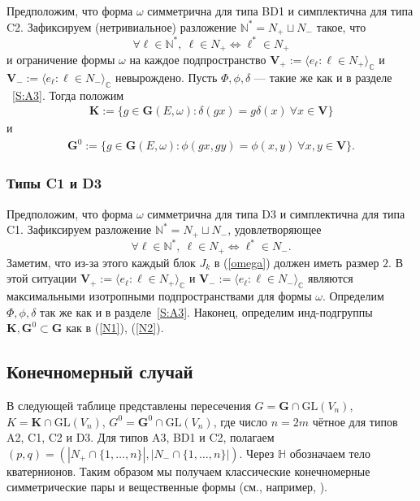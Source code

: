 \documentclass{amsart}
\theoremstyle{definition}
\newcommand{\NN}{\mathbb{N}^*}
\begin{document}
Предположим, что форма $\omega$ симметрична для типа BD1 и симплектична для типа C2.
Зафиксируем (нетривиальное) разложение $\NN=N_+\sqcup N_-$ такое, что
\[\forall \ell\in\NN,\ \ell\in N_+\Leftrightarrow \ell^*\in N_+\]
и ограничение формы $\omega$ на каждое подпространство $\mathbf{V}_+:=\langle e_\ell:\ell\in N_+\rangle_\mathbb{C}$ и
$\mathbf{V}_-:=\langle e_\ell:\ell\in N_-\rangle_\mathbb{C}$ невырождено.
Пусть  $\Phi,\phi,\delta$ --- такие же как и в разделе ~\ref{S:A3}.  Тогда  положим
\begin{eqnarray}
\label{N1}
 \mathbf{K}:=\{g\in \mathbf{G}(E,\omega):\delta(gx)=g\delta(x)\ \forall
x\in\mathbf{V}\}
\end{eqnarray}
и
\begin{eqnarray}
\label{N2}
 \mathbf{G}^0:=\{g\in \mathbf{G}(E,\omega):\phi(gx,gy)=\phi(x,y)\ \forall
 x,y\in\mathbf{V}\}.
\end{eqnarray}


\subsubsection{Типы C1 и D3}
\label{S:C1D3}
Предположим, что форма $\omega$ симметрична для типа D3 и симплектична для типа C1.
Зафиксируем разложение $\NN=N_+\sqcup N_-$, удовлетворяющее
\[
\forall \ell\in\NN,\ \ell\in N_+\Leftrightarrow \ell^*\in N_-.
\]
Заметим, что из-за этого каждый блок  $J_k$ в (\ref{omega}) должен иметь размер $2$.
В этой ситуации $\mathbf{V}_+:=\langle e_\ell:\ell\in N_+\rangle_\mathbb{C}$ и $\mathbf{V}_-:=\langle e_\ell:\ell\in N_-\rangle_\mathbb{C}$
являются максимальными изотропными подпространствами для формы $\omega$.
Определим $\Phi,\phi,\delta$ так же как и в разделе~\ref{S:A3}. Наконец,  определим инд-подгруппы $\mathbf{K},\mathbf{G}^0\subset\mathbf{G}$  как  в (\ref{N1}), (\ref{N2}).


\subsection*{Конечномерный случай}
В следующей таблице представлены пересечения $G=\textbf{G}\cap\mathrm{GL}\left(V_n\right)$, $K=\textbf{K}\cap\mathrm{GL}\left(V_n\right)$, $G^0=\textbf{G}^0\cap\mathrm{GL}\left(V_n\right)$, где число $n=2m$ чётное для типов A2, C1, C2 и D3.
Для типов A3, BD1 и C2, полагаем $(p,q)=(|N_+\cap\{1,\ldots,n\}|,|N_-\cap\{1,\ldots,n\}|)$.
Через $\mathbb{H}$  обозначаем тело кватернионов.
Таким образом мы получаем классические конечномерные симметрические пары и вещественные формы
(см., например, \cite{Berger,OV,Otha1}).
\end{document}
